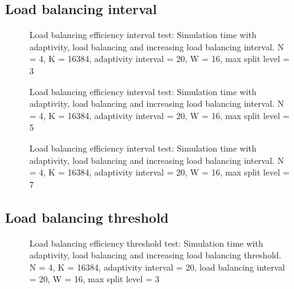 \subsection{Load balancing interval}\label{subsection:results:load_balancing_performance:interval}

\begin{figure}[H]
	\centering
	
	\caption{Load balancing efficiency interval test: Simulation time with adaptivity, load balancing and increasing load balancing interval. N = 4, K = 16384, adaptivity interval = 20, W = 16, max split level = 3}\label{fig:load_balancing_efficiency_interval}
\end{figure}

\begin{figure}[H]
	\centering
	
	\caption{Load balancing efficiency interval test: Simulation time with adaptivity, load balancing and increasing load balancing interval. N = 4, K = 16384, adaptivity interval = 20, W = 16, max split level = 5}\label{fig:load_balancing_efficiency_interval_s5}
\end{figure}

\begin{figure}[H]
	\centering
	
	\caption{Load balancing efficiency interval test: Simulation time with adaptivity, load balancing and increasing load balancing interval. N = 4, K = 16384, adaptivity interval = 20, W = 16, max split level = 7}\label{fig:load_balancing_efficiency_interval_s7}
\end{figure}


\subsection{Load balancing threshold}\label{subsection:results:load_balancing_performance:threshold}

\begin{figure}[H]
	\centering
	
	\caption{Load balancing efficiency threshold test: Simulation time with adaptivity, load balancing and increasing load balancing threshold. N = 4, K = 16384, adaptivity interval = 20, load balancing interval = 20, W = 16, max split level = 3}\label{fig:load_balancing_efficiency_threshold_s3}
\end{figure}


